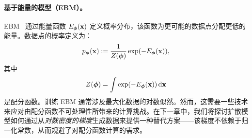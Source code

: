 \paragraph{基于能量的模型（EBM）。}
EBM~\citep{ackley1985learning,lecun2006tutorial} 通过能量函数 $ E_{\bm{\phi}}({\mathbf{x}}) $ 定义概率分布，该函数为更可能的数据点分配更低的能量。数据点的概率定义为：
\begin{equation*}
    p_{\bm{\phi}}({\mathbf{x}}) := \frac{1}{Z({\bm{\phi}})} \exp(-E_{\bm{\phi}}({\mathbf{x}})),
\end{equation*}
其中
\[Z({\bm{\phi}}) = \int \exp(-E_{\bm{\phi}}({\mathbf{x}})) \mathop{}\!\mathrm{d}{\mathbf{x}}\]
是配分函数。训练 EBM 通常涉及最大化数据的对数似然。然而，这需要一些技术来应对由配分函数不可处理性所带来的计算挑战。在下一章中，我们将探讨扩散模型如何通过从\emph{对数密度的梯度}生成数据来提供一种替代方案——该梯度不依赖于归一化常数，从而规避了对配分函数计算的需求。









